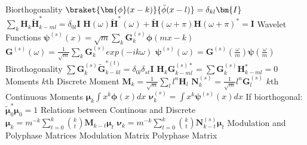 \documentclass[14pt]{extarticle}
\begin{document}
\begin{outline}
				\3	Biorthogonality
					\4	$\braket{\bm{\phi}(x - k)}{\tilde{\phi}(x - l)} = \delta_{kl}\bm{I}$
					\4	$\sum_k \bm{H}_k \tilde{\bm{H}}^*_{k - ml} = \delta_{0l}\bm{I}$
					\4	$\bm{H}(\omega)\tilde{\bm{H}}^*(\omega) + 
							\tilde{\bm{H}}(\omega + \pi){\bm{H}}(\omega + \pi)^* = \bm{I}$
			\2	Wavelet Functions
				\3	$\bm{\psi}^{(s)}(x) = \sqrt{m}\sum_k \bm{G}_k^{(s)}\bm{\phi}(mx - k)$
					\4	$\bm{G}^{(s)}(\omega) = \frac{1}{\sqrt{m}}\sum_k \bm{G}_k^{(s)}exp(-ik\omega)$
					\4	$\bm{\psi}^{(s)}(\omega) = \bm{G}^{(s)}(\frac{\omega}{m})\bm{\psi}(\frac{\omega}{m})$
				\3	Birothogonality
					\4	$\sum \bm{G}_k^{(s)} \tilde{\bm{G}}_{k - kl}^{*(t)} = \delta_{0l}\delta_{st}\bm{I}$
					\4	$\bm{H}_k\bm{G}_{k-ml}^{(s)*} = \sum \bm{G}_k^{(s)}\bm{H}_{k - ml}^{*} = 0$
			\2	Moments
				\3	$k$th Discrete Moment 
					\4	$\bm{M}_k = \frac{1}{\sqrt{m}}\sum_l l^n \bm{H}_l$
					\4	$\bm{N}_k^{(s)} = \frac{1}{\sqrt{m}}l^n \bm{G}_l^{(s)}$
				\3	$k$th Continuous Moments
					\4	$\bm{\mu}_k \int x^k \bm{\phi}(x)dx$
					\4	$\bm{\nu}_k^{(s)} = \int x^k \bm{\psi}^{(s)}(x) dx$
					\4	If biorthogonal: $\tilde{\bm{\mu}}_0^* \bm{\mu}_0 = 1$
				\3	Relations between Continous and Discrete
					\4	$\bm{\mu}_k = m^{-k} \sum_{t = 0}^k \binom{k}{t}\bm{M}_{k-t}\bm{\mu}_t$
					\4	$\bm{\nu}_k = m^{-k} \sum_{t = 0}^k \binom{k}{t}\bm{N}_{k-t}^{(s)}\bm{\mu}_t$
		\1	Modulation and Polyphase Matrices
			\2	Modulation Matrix
			\2	Polyphase Matrix
		

	\end{outline}
\end{document}
